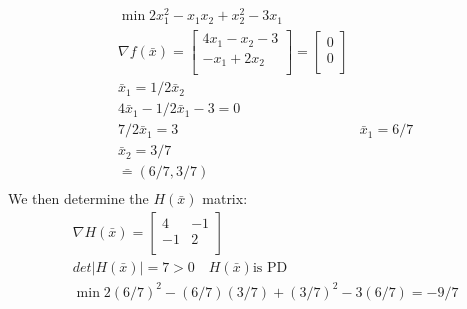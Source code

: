 \documentclass[12pt]{article}
\begin{document}
    \begin{align*}
        &\min 2x_1^2 -x_1x_2 + x_2^2 - 3x_1\\
        &\nabla f(\bar x) = 
        \begin{bmatrix}
            4x_1 - x_2 -3\\
            -x_1 + 2x_2\\
        \end{bmatrix}
        = 
        \begin{bmatrix}
            0\\
            0\\
        \end{bmatrix}\\
        &\bar x_1 = 1/2 \bar x_2\\
        &4 \bar x_1 - 1/2 \bar x_1 - 3 = 0 \\ 
        &7/2\bar x_1 = 3
        &\bar x_1 = 6/7\\
        &\bar x_2 = 3/7\\
        &\bar = (6/7 , 3/7)\\ 
    \end{align*}
We then determine the $H(\bar x)$ matrix: 
    \begin{align*}
        &\nabla H(\bar x) = 
        \begin{bmatrix}
            4 & -1\\
            -1 & 2\\
        \end{bmatrix}\\
        &det|H(\bar x)| = 7 > 0 \quad H(\bar x) \text{is PD}\\
        &\min 2(6/7)^2 - (6/7)(3/7) + (3/7)^2 - 3 (6/7) = -9/7 
    \end{align*}
\end{document}
